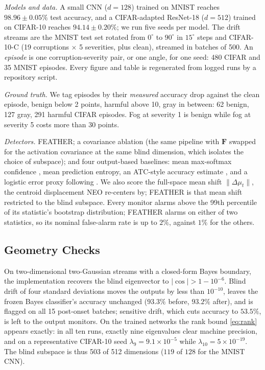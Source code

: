 \documentclass[conference]{IEEEtran}
\newcommand{\F}{\mathbf{F}}
\begin{document}
\textit{Models and data.}
A small CNN ($d = 128$) trained on MNIST reaches $98.96 \pm 0.05\%$ test
accuracy, and a CIFAR-adapted ResNet-18 ($d = 512$) trained on CIFAR-10
reaches $94.14 \pm 0.20\%$; we run five seeds per model. The drift streams are
the MNIST test set rotated from $0^\circ$ to $90^\circ$ in $15^\circ$ steps and
CIFAR-10-C \cite{hendrycks2019benchmarking} (19 corruptions $\times$ 5
severities, plus clean), streamed in batches of 500. An \emph{episode} is one
corruption-severity pair, or one angle, for one seed: 480 CIFAR and 35 MNIST
episodes. Every figure and table is regenerated from logged runs by a
repository script.

\textit{Ground truth.}
We tag episodes by their \emph{measured} accuracy drop against the clean
episode, benign below 2 points, harmful above 10, gray in between: 62 benign,
127 gray, 291 harmful CIFAR episodes. Fog at severity 1 is benign while fog at
severity 5 costs more than 30 points.

\textit{Detectors.}
FEATHER; a covariance ablation (the same pipeline with $\F$ swapped for the
activation covariance at the same blind dimension, which isolates the choice
of subspace); and four output-based baselines: mean max-softmax confidence
\cite{hendrycks2017baseline}, mean prediction entropy, an ATC-style accuracy
estimate \cite{garg2022atc}, and a logistic error proxy following
\cite{amoukou2024sequential}. We also score the full-space mean shift
$\lVert\Delta\mu_t\rVert$, the centroid displacement NEO \cite{murphy2026neo}
re-centers by; FEATHER is that mean shift restricted to the blind subspace.
Every monitor alarms above the 99th percentile of its statistic's bootstrap
distribution; FEATHER alarms on either of two statistics, so its nominal
false-alarm rate is up to $2\%$, against $1\%$ for the others.

\subsection{Geometry Checks}
\label{sec:geomchecks}

On two-dimensional two-Gaussian streams with a closed-form Bayes boundary, the
implementation recovers the blind eigenvector to $|\cos| > 1 - 10^{-6}$. Blind
drift of four standard deviations moves the outputs by less than $10^{-10}$,
leaves the frozen Bayes classifier's accuracy unchanged ($93.3\%$ before,
$93.2\%$ after), and is flagged on all 15 post-onset batches; sensitive drift,
which cuts accuracy to $53.5\%$, is left to the output monitors. On the trained
networks the rank bound \eqref{eq:rank} appears exactly: in all ten runs,
exactly nine eigenvalues clear machine precision, and on a representative
CIFAR-10 seed $\lambda_9 = 9.1 \times 10^{-5}$ while
$\lambda_{10} = 5 \times 10^{-19}$. The blind subspace is thus 503 of 512
dimensions ($119$ of $128$ for the MNIST CNN).
\end{document}
